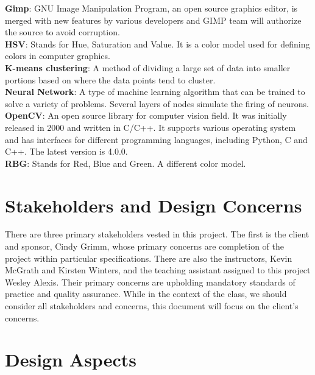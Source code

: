 \documentclass[10pt,journal,compsoc, draftclsnofoot,onecolumn]{IEEEtran}
\begin{document}
\noindent \textbf{Gimp}: GNU Image Manipulation Program, an open source graphics editor, is merged with new features by various developers and GIMP team will authorize the source to avoid corruption. \\

\noindent \textbf{HSV}: Stands for Hue, Saturation and Value. It is a color model used for defining colors in computer graphics. \\

\noindent \textbf{K-means clustering}: A method of dividing a large set of data into smaller portions based on where the data points tend to cluster. \\

\noindent \textbf{Neural Network}: A type of machine learning algorithm that can be trained to solve a variety of problems. Several layers of nodes simulate the firing of neurons. \\

\noindent \textbf{OpenCV}: An open source library for computer vision field. It was initially released in 2000 and written in C/C++. It supports various operating system and has interfaces for different programming languages, including Python, C and C++. The latest version is 4.0.0. \\

\noindent \textbf{RBG}: Stands for Red, Blue and Green. A different color model. \\

\section{Stakeholders and Design Concerns}
There are three primary stakeholders vested in this project. The first is the client and sponsor, Cindy Grimm, whose primary concerns are completion of the project within particular specifications. There are also the instructors, Kevin McGrath and Kirsten Winters, and the teaching assistant assigned to this project Wesley  Alexis. Their primary concerns are upholding mandatory standards of practice and quality assurance. While in the context of the class, we should consider all stakeholders and concerns, this document will focus on the client's concerns.


\section{Design Aspects}
\end{document}
